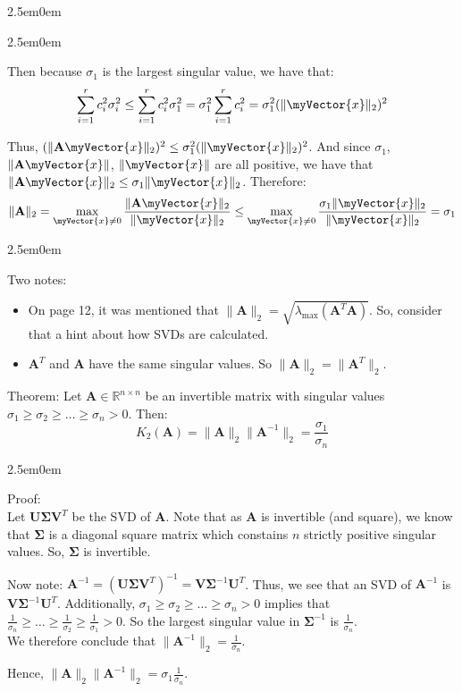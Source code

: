 \documentclass{book}
\newcommand{\hThree}{%
   \color{PineGreen}
   \fontsize{13}{15}\selectfont%
}
\newcommand{\hFour}{%
   \color{Cerulean}
   \fontsize{12}{14}\selectfont%
}
\newenvironment{myIndent}{%
   \begin{adjustwidth}{2.5em}{0em}%
}{%
   \end{adjustwidth}%
}
\newcommand{\uuline}[2][.]{%
{\vphantom{a}\color{#1}%
\rlap{\rule[-0.18em]{\widthof{#2}}{0.06em}}%
\rlap{\rule[-0.32em]{\widthof{#2}}{0.06em}}}%
#2}
\newcommand{\retTwo}{\hfill\bigbreak}
\newcommand{\mVec}[1]{\myVector{#1}}
\newcommand{\mMat}[1]{\mathbf{#1}}
\begin{document}
{\begin{myIndent}
{\begin{myIndent}
      Then because $\sigma_1$ is the largest singular value, we have that:
      \[\sum\limits_{i=1}^r{c_i^2\sigma_i^2} \leq \sum\limits_{i=1}^r{c_i^2\sigma_1^2} = \sigma_1^2\sum\limits_{i=1}^r{c_i^2} = \sigma_1^2(\|\mVec{x}\|_2)^2 \]

      Thus, $(\|\mMat{A}\mVec{x}\|_2)^2 \leq \sigma_1^2(\|\mVec{x}\|_2)^2$. And since $\sigma_1$, $\|\mMat{A}\mVec{x}\|$, $\|\mVec{x}\|$ are all positive, we have that $\|\mMat{A}\mVec{x}\|_2 \leq \sigma_1\|\mVec{x}\|_2$. Therefore:
      \[\|\mMat{A}\|_2 = \max\limits_{\mVec{x} \neq 0}{\frac{\|\mMat{A}\mVec{x}\|_2}{\|\mVec{x}\|_2}} \leq \max\limits_{\mVec{x} \neq 0}{\frac{\sigma_1\|\mVec{x}\|_2}{\|\mVec{x}\|_2}} = \sigma_1\]

      
      {\begin{myIndent} \hFour
         Two notes:
         \begin{itemize}
            \item On page 12, it was mentioned that $\| \mMat{A} \|_2 = \sqrt{\lambda_{\max}(\mMat{A}^T\mMat{A})}$. So, consider that a hint about how SVDs are calculated.
            
            \item $\mMat{A}^T$ and $\mMat{A}$ have the same singular values. So $\|\mMat{A}\|_2 = \|\mMat{A}^T\|_2$.
         \end{itemize}
      \end{myIndent}}
      \end{myIndent}}
      \retTwo

      \uuline{Theorem}: Let $\mMat{A} \in \mathbb{R}^{n \times n}$ be an invertible matrix with singular values\\ $\sigma_1 \geq \sigma_2 \geq \ldots \geq \sigma_n > 0$. Then:
      \[K_2(\mMat{A}) = \|\mMat{A}\|_2\|\mMat{A}^{-1}\|_2 = \frac{\sigma_1}{\sigma_n}\]

      
      {\begin{myIndent} \hThree
         Proof:\\
         Let $\mMat{U}\bm{\Sigma}\mMat{V}^T$ be the SVD of $\mMat{A}$. Note that as $\mMat{A}$ is invertible (and square), we know that $\bm{\Sigma}$ is a diagonal square matrix which constains $n$ strictly positive singular values. So, $\bm{\Sigma}$ is invertible. \retTwo

         Now note: $\mMat{A}^{-1} = (\mMat{U}\bm{\Sigma}\mMat{V}^T)^{-1} = \mMat{V}\bm{\Sigma}^{-1}\mMat{U}^T$. Thus, we see that an SVD of $\mMat{A}^{-1}$ is $\mMat{V}\bm{\Sigma}^{-1}\mMat{U}^T$. Additionally, $\sigma_1 \geq \sigma_2 \geq \ldots \geq \sigma_n > 0$ implies that\\ $\frac{1}{\sigma_n} \geq \ldots \geq \frac{1}{\sigma_2} \geq \frac{1}{\sigma_1} > 0$. So the largest singular value in $\bm{\Sigma}^{-1}$ is $\frac{1}{\sigma_n}$.\\ We therefore conclude that $\|\mMat{A}^{-1}\|_2 = \frac{1}{\sigma_n}$. \retTwo

         Hence, $\|\mMat{A}\|_2\|\mMat{A}^{-1}\|_2 = \sigma_1\frac{1}{\sigma_n}$.
      \end{myIndent}}

      \newpage
   
   \end{myIndent}}
\end{document}
